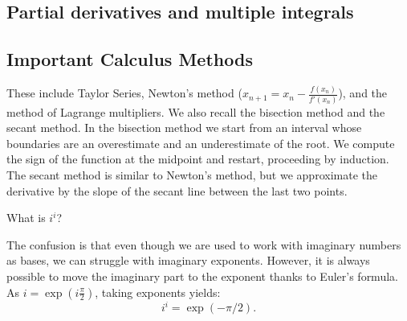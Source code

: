 \subsection{Partial derivatives and multiple integrals}


\subsection{Important Calculus Methods}

These include Taylor Series, Newton's method ($x_{n+1} = x_n - \frac{f(x_n)}{f'(x_n)}$), and the method of Lagrange multipliers.
We also recall the bisection method and the secant method.
In the bisection method we start from an interval whose boundaries are an overestimate and an underestimate of the root. We compute the sign of the function at the midpoint and restart, proceeding by induction.
The secant method is similar to Newton's method, but we approximate the derivative by the slope of the secant line between the last two points.

\begin{qanda}
    \Q
    What is $i^i$?

    \A
    The confusion is that even though we are used to work with imaginary numbers as bases, we can struggle with imaginary exponents.
    However, it is always possible to move the imaginary part to the exponent thanks to Euler's formula. As $i  = \exp \left( i \frac{\pi}{2} \right)$, taking exponents yields:
    \[
     i^i = \exp(-\pi / 2).
    \]
\end{qanda}

